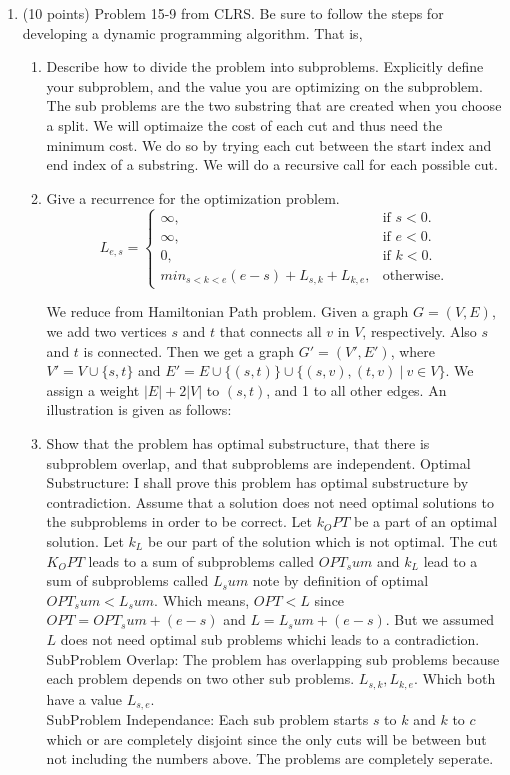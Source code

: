 \documentclass[letterpaper,11pt]{article}
\begin{document}
\begin{enumerate}
\item (10 points) Problem 15-9 from CLRS. Be sure to follow the steps for developing a dynamic programming algorithm. That is,
\begin{enumerate}
\item Describe how to divide the problem into subproblems. Explicitly define your subproblem, and the value you are optimizing on the subproblem.
The sub problems are the two substring that are created when you choose a split. We will optimaize the cost of each cut and thus need the minimum cost. We do so by trying each cut between the start index and end index of a substring. We will do a recursive call for each possible cut.
\item Give a recurrence for the optimization problem.
\begin{equation}
  L_{e,s}=\begin{cases}
    \infty, & \text{if $s<0$}.\\
    \infty, & \text{if $e<0$}.\\
    0, & \text{if $k<0$}.\\
    min_{s<k<e} {(e-s) + L_{s,k}+L_{k,e}}, & \text{otherwise}.
  \end{cases}
\end{equation}

 We reduce from Hamiltonian Path problem. Given a graph $G=(V,E)$, we add two
  vertices $s$ and $t$ that connects all $v$ in $V$, respectively. Also $s$ and
  $t$ is connected.  Then we get a graph $G'=(V',E')$, where $V'=V\cup \{s,t\}$
  and $E'=E\cup \{(s,t)\} \cup \{(s,v), (t,v) \ |\  v\in V\}$.  We assign a
  weight $|E|+2|V|$ to $(s,t)$, and 1 to all other edges.  An illustration is
given as follows: 


\item Show that the problem has optimal substructure, that there is subproblem overlap, and that subproblems are independent.
Optimal Substructure: I shall prove this problem has optimal substructure by contradiction. Assume that a solution does not need optimal solutions to the subproblems in order to be correct. Let $k_OPT$ be a part of an optimal solution. Let $k_L$ be our part of the solution which is not optimal. The cut $K_OPT$ leads to a sum of subproblems called $OPT_sum$ and $k_L$ lead to a sum of subproblems called $L_sum$ note by definition of optimal $OPT_sum < L_sum$. Which means, $OPT < L$ since $OPT = OPT_sum + (e-s)$ and $L = L_sum + (e-s)$. But we assumed $L$ does not need optimal sub problems whichi leads to a contradiction.\\
SubProblem Overlap: The problem has overlapping sub problems because each problem depends on two other sub problems. $L_{s,k},L_{k,e}$. Which both have a value $L_{s,e}$.\\
SubProblem Independance: Each sub problem starts $s$ to $k$ and $k$ to $c$ which or are completely disjoint since the only cuts will be between but not including the numbers above. The problems are completely seperate.



\end{enumerate}
\end{enumerate}
\end{document}
